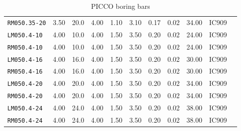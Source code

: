\begin{table}[h!]
\begin{longtable}{l|llllllllll}
\texttt{RM050.35-20}
    &3.50
    &20.0
    &4.00
    &1.10
    &3.10
    &0.17
    &0.02
    &34.00
    &IC909
  \\


\texttt{LM050.4-10}
    &4.00
    &10.0
    &4.00
    &1.50
    &3.50
    &0.20
    &0.02
    &24.00
    &IC909
  \\


\texttt{RM050.4-10}
    &4.00
    &10.0
    &4.00
    &1.50
    &3.50
    &0.20
    &0.02
    &24.00
    &IC909
  \\


\texttt{LM050.4-16}
    &4.00
    &16.0
    &4.00
    &1.50
    &3.50
    &0.20
    &0.02
    &30.00
    &IC909
  \\


\texttt{RM050.4-16}
    &4.00
    &16.0
    &4.00
    &1.50
    &3.50
    &0.20
    &0.02
    &30.00
    &IC909
  \\


\texttt{LM050.4-20}
    &4.00
    &20.0
    &4.00
    &1.50
    &3.50
    &0.20
    &0.02
    &34.00
    &IC909
  \\


\texttt{RM050.4-20}
    &4.00
    &20.0
    &4.00
    &1.50
    &3.50
    &0.20
    &0.02
    &34.00
    &IC909
  \\


\texttt{LM050.4-24}
    &4.00
    &24.0
    &4.00
    &1.50
    &3.50
    &0.20
    &0.02
    &38.00
    &IC909
  \\


\texttt{RM050.4-24}
    &4.00
    &24.0
    &4.00
    &1.50
    &3.50
    &0.20
    &0.02
    &38.00
    &IC909
  \\


\end{longtable}
\caption{PICCO boring bars}
\end{table}

